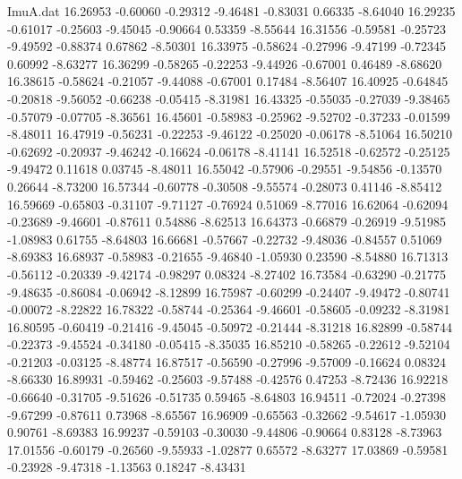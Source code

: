 \begin{filecontents}{ImuA.dat}
  16.26953   -0.60060   -0.29312   -9.46481   -0.83031    0.66335   -8.64040
  16.29235   -0.61017   -0.25603   -9.45045   -0.90664    0.53359   -8.55644
  16.31556   -0.59581   -0.25723   -9.49592   -0.88374    0.67862   -8.50301
  16.33975   -0.58624   -0.27996   -9.47199   -0.72345    0.60992   -8.63277
  16.36299   -0.58265   -0.22253   -9.44926   -0.67001    0.46489   -8.68620
  16.38615   -0.58624   -0.21057   -9.44088   -0.67001    0.17484   -8.56407
  16.40925   -0.64845   -0.20818   -9.56052   -0.66238   -0.05415   -8.31981
  16.43325   -0.55035   -0.27039   -9.38465   -0.57079   -0.07705   -8.36561
  16.45601   -0.58983   -0.25962   -9.52702   -0.37233   -0.01599   -8.48011
  16.47919   -0.56231   -0.22253   -9.46122   -0.25020   -0.06178   -8.51064
  16.50210   -0.62692   -0.20937   -9.46242   -0.16624   -0.06178   -8.41141
  16.52518   -0.62572   -0.25125   -9.49472    0.11618    0.03745   -8.48011
  16.55042   -0.57906   -0.29551   -9.54856   -0.13570    0.26644   -8.73200
  16.57344   -0.60778   -0.30508   -9.55574   -0.28073    0.41146   -8.85412
  16.59669   -0.65803   -0.31107   -9.71127   -0.76924    0.51069   -8.77016
  16.62064   -0.62094   -0.23689   -9.46601   -0.87611    0.54886   -8.62513
  16.64373   -0.66879   -0.26919   -9.51985   -1.08983    0.61755   -8.64803
  16.66681   -0.57667   -0.22732   -9.48036   -0.84557    0.51069   -8.69383
  16.68937   -0.58983   -0.21655   -9.46840   -1.05930    0.23590   -8.54880
  16.71313   -0.56112   -0.20339   -9.42174   -0.98297    0.08324   -8.27402
  16.73584   -0.63290   -0.21775   -9.48635   -0.86084   -0.06942   -8.12899
  16.75987   -0.60299   -0.24407   -9.49472   -0.80741   -0.00072   -8.22822
  16.78322   -0.58744   -0.25364   -9.46601   -0.58605   -0.09232   -8.31981
  16.80595   -0.60419   -0.21416   -9.45045   -0.50972   -0.21444   -8.31218
  16.82899   -0.58744   -0.22373   -9.45524   -0.34180   -0.05415   -8.35035
  16.85210   -0.58265   -0.22612   -9.52104   -0.21203   -0.03125   -8.48774
  16.87517   -0.56590   -0.27996   -9.57009   -0.16624    0.08324   -8.66330
  16.89931   -0.59462   -0.25603   -9.57488   -0.42576    0.47253   -8.72436
  16.92218   -0.66640   -0.31705   -9.51626   -0.51735    0.59465   -8.64803
  16.94511   -0.72024   -0.27398   -9.67299   -0.87611    0.73968   -8.65567
  16.96909   -0.65563   -0.32662   -9.54617   -1.05930    0.90761   -8.69383
  16.99237   -0.59103   -0.30030   -9.44806   -0.90664    0.83128   -8.73963
  17.01556   -0.60179   -0.26560   -9.55933   -1.02877    0.65572   -8.63277
  17.03869   -0.59581   -0.23928   -9.47318   -1.13563    0.18247   -8.43431

\end{filecontents}
